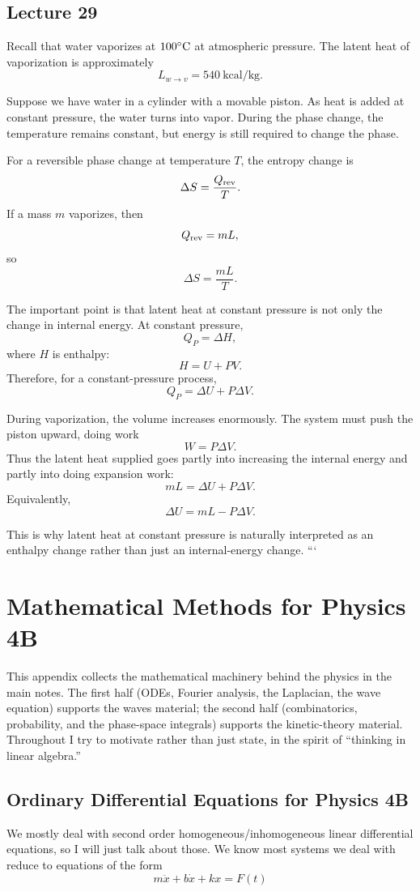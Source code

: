 \documentclass{report}
\numberwithin{equation}{section}
\begin{document}
\section{Lecture 29}

Recall that water vaporizes at \(100^\circ{\rm C}\) at atmospheric pressure. The latent heat of vaporization is approximately
\[
L_{w\to v}=540\ \text{kcal/kg}.
\]

Suppose we have water in a cylinder with a movable piston. As heat is added at constant pressure, the water turns into vapor. During the phase change, the temperature remains constant, but energy is still required to change the phase.

For a reversible phase change at temperature \(T\), the entropy change is
\[
\Delta S=\frac{Q_{\rm rev}}{T}.
\]
If a mass \(m\) vaporizes, then
\[
Q_{\rm rev}=mL,
\]
so
\[
\Delta S=\frac{mL}{T}.
\]

The important point is that latent heat at constant pressure is not only the change in internal energy. At constant pressure,
\[
Q_P=\Delta H,
\]
where \(H\) is enthalpy:
\[
H=U+PV.
\]
Therefore, for a constant-pressure process,
\[
Q_P=\Delta U+P\Delta V.
\]

During vaporization, the volume increases enormously. The system must push the piston upward, doing work
\[
W=P\Delta V.
\]
Thus the latent heat supplied goes partly into increasing the internal energy and partly into doing expansion work:
\[
mL=\Delta U+P\Delta V.
\]
Equivalently,
\[
\Delta U=mL-P\Delta V.
\]

This is why latent heat at constant pressure is naturally interpreted as an enthalpy change rather than just an internal-energy change.
```

\clearpage
\appendix
\chapter{Mathematical Methods for Physics 4B}
\noindent This appendix collects the mathematical machinery behind the
physics in the main notes. The first half (ODEs, Fourier analysis, the
Laplacian, the wave equation) supports the waves material; the second half
(combinatorics, probability, and the phase-space integrals) supports the
kinetic-theory material. Throughout I try to motivate rather than just state,
in the spirit of ``thinking in linear algebra.''

\section{Ordinary Differential Equations for Physics 4B}
We mostly deal with second order homogeneous/inhomogeneous linear differential equations, so I will just talk about those. We know most systems we deal with reduce to equations of the form
\begin{equation}
	m\ddot{x} + b\dot{x} + kx = F(t)
\end{equation}
\end{document}
